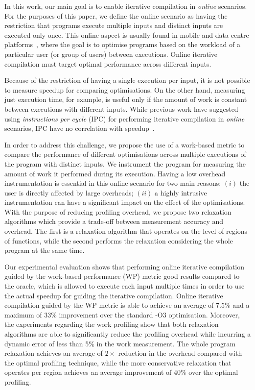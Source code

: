 \documentclass[sigplan,10pt]{acmart}
\theoremstyle{definition}
\newcommand{\itercomp}{{iterative compilation}}
\newcommand{\flagstype}{\usefont{T1}{cmr}{m}{n}}
\begin{document}
In this work, our main goal is to enable {\itercomp} in \textit{online} scenarios.
For the purposes of this paper, we define the online scenario as having the restriction that programs execute multiple inputs and distinct inputs are executed only once.
This online aspect is usually found in mobile and data centre platforms~\citep{chen12b,fang15,mpeis16}, where the goal is to optimise programs based on the workload of a particular user (or group of users) between executions.
Online {\itercomp} must target optimal performance across different inputs.

Because of the restriction of having a single execution per input, it is not possible to measure speedup for comparing optimisations.
On the other hand, measuring just execution time, for example, is useful only if the amount of work is constant between executions with different inputs.
While previous work have suggested using \textit{instructions per cycle} (IPC) for performing {\itercomp} in \textit{online} scenarios, IPC have no correlation with speedup~\citep{fursin07}.

In order to address this challenge, we propose the use of a work-based metric to compare the performance of different optimisations across multiple executions of the program with distinct inputs.
We instrument the program for measuring the amount of work it performed during its execution.
Having a low overhead instrumentation is essential in this online scenario for two main reasons:
$(i)$ the user is directly affected by large overheads;
$(ii)$ a highly intrusive instrumentation can have a significant impact on the effect of the optimisations.
With the purpose of reducing profiling overhead, we propose two relaxation algorithms which provide a trade-off between measurement accuracy and overhead.
The first is a relaxation algorithm that operates on the level of regions of functions, while the second performs the relaxation considering the whole program at the same time.

Our experimental evaluation shows that performing online {\itercomp} guided by the work-based performance (WP) metric good results compared to the oracle, which is allowed to execute each input multiple times in order to use the actual speedup for guiding the {\itercomp}.
Online {\itercomp} guided by the WP metric is able to achieve an average of 7.5\% and a maximum of 33\% improvement over the standard {\flagstype -O3} optimisation.
Moreover, the experiments regarding the work profiling show that both relaxation algorithms are able to significantly reduce the profiling overhead while incurring a dynamic error of less than 5\% in the work measurement.
The whole program relaxation achieves an average of $2\times$ reduction in the overhead compared with the optimal profiling technique, while the more conservative relaxation that operates per region achieves an average improvement of 40\% over the optimal profiling.
\end{document}
